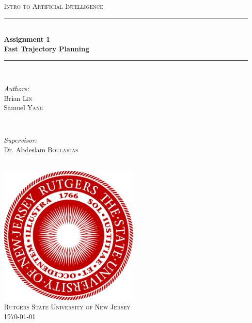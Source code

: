 \documentclass[12pt]{article}
\begin{document}
	
	\begin{titlepage}
		\newcommand{\HRule}{\noindent\rule{6.5in}{1pt}} %
		
		\centering
		
		\textsc{\Large Intro to Artificial Intelligence}\\[.75cm]
		
		\noindent\rule{6.5in}{1.5pt}\\[.75cm]
		{ \huge \bfseries Assignment 1}\\[.4cm]
		{ \large \bfseries Fast Trajectory Planning}\\[.2cm]
		\noindent\rule{6.5in}{1.5pt}\\[1cm]
		
		
		\begin{minipage}{0.4\textwidth}
			\begin{flushleft} \large
				\emph{Authors:}\\
				Brian \textsc{Lin} \\
				Samuel \textsc{Yang}
			\end{flushleft}
		\end{minipage}
		~
		\begin{minipage}{0.4\textwidth}
			\begin{flushright} \large
				\emph{Supervisor:} \\
				Dr. Abdeslam  \textsc{Boularias} %
			\end{flushright}
		\end{minipage}\\[2cm]

		\includegraphics[width=200pt,height=200pt]{RutgersLogo.png}\\[1.5cm]
		\textsc{\Large Rutgers State University of New Jersey}\\[1cm]
		{\large \today}\\[2cm]
		
		\vfill %
		
	\end{titlepage}
	
\end{document}
